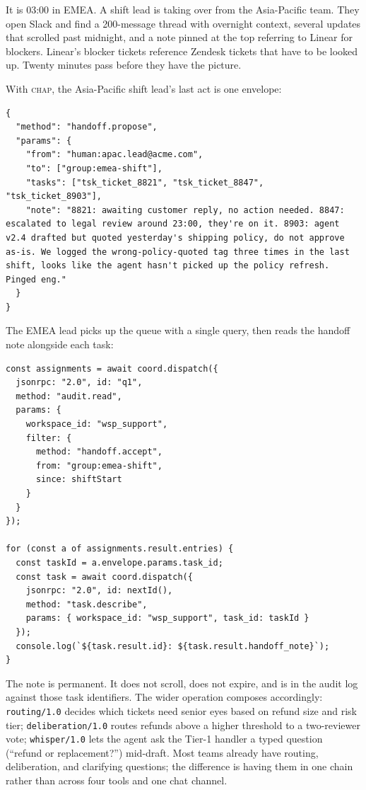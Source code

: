\documentclass[11pt]{article}
\newcommand{\chap}{\textsc{chap}}
\begin{document}
It is 03:00 in EMEA. A shift lead is taking over from the Asia-Pacific team. They open Slack and find a 200-message thread with overnight context, several updates that scrolled past midnight, and a note pinned at the top referring to Linear for blockers. Linear's blocker tickets reference Zendesk tickets that have to be looked up. Twenty minutes pass before they have the picture.

With \chap{}, the Asia-Pacific shift lead's last act is one envelope:

\begin{lstlisting}[caption={Shift handoff envelope.},label={lst:case4-handoff}]
{
  "method": "handoff.propose",
  "params": {
    "from": "human:apac.lead@acme.com",
    "to": ["group:emea-shift"],
    "tasks": ["tsk_ticket_8821", "tsk_ticket_8847", "tsk_ticket_8903"],
    "note": "8821: awaiting customer reply, no action needed. 8847: escalated to legal review around 23:00, they're on it. 8903: agent v2.4 drafted but quoted yesterday's shipping policy, do not approve as-is. We logged the wrong-policy-quoted tag three times in the last shift, looks like the agent hasn't picked up the policy refresh. Pinged eng."
  }
}
\end{lstlisting}

The EMEA lead picks up the queue with a single query, then reads the handoff note alongside each task:

\begin{lstlisting}[caption={Picking up the queue at shift change.},label={lst:case4-pickup}]
const assignments = await coord.dispatch({
  jsonrpc: "2.0", id: "q1",
  method: "audit.read",
  params: {
    workspace_id: "wsp_support",
    filter: {
      method: "handoff.accept",
      from: "group:emea-shift",
      since: shiftStart
    }
  }
});

for (const a of assignments.result.entries) {
  const taskId = a.envelope.params.task_id;
  const task = await coord.dispatch({
    jsonrpc: "2.0", id: nextId(),
    method: "task.describe",
    params: { workspace_id: "wsp_support", task_id: taskId }
  });
  console.log(`${task.result.id}: ${task.result.handoff_note}`);
}
\end{lstlisting}

The note is permanent. It does not scroll, does not expire, and is in the audit log against those task identifiers. The wider operation composes accordingly: \texttt{routing/1.0} decides which tickets need senior eyes based on refund size and risk tier; \texttt{deliberation/1.0} routes refunds above a higher threshold to a two-reviewer vote; \texttt{whisper/1.0} lets the agent ask the Tier-1 handler a typed question (``refund or replacement?'') mid-draft. Most teams already have routing, deliberation, and clarifying questions; the difference is having them in one chain rather than across four tools and one chat channel.
\end{document}
